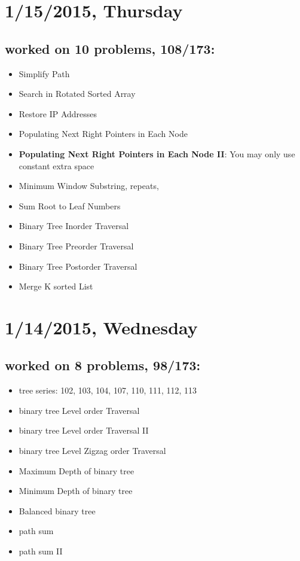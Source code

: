 \documentclass[9pt,b5paper]{article}
\begin{document}
\section{1/15/2015, Thursday}
\label{sec-12}
\subsection{worked on 10 problems, 108/173:}
\label{sec-12-1}
\begin{itemize}
\item Simplify Path
\item Search in Rotated Sorted Array
\item Restore IP Addresses
\item Populating Next Right Pointers in Each Node
\item \textbf{Populating Next Right Pointers in Each Node II}: You may only use constant extra space
\item Minimum Window Substring, repeats,
\item Sum Root to Leaf Numbers
\item Binary Tree Inorder Traversal
\item Binary Tree Preorder Traversal
\item Binary Tree Postorder Traversal
\item Merge K sorted List
\end{itemize}
\section{1/14/2015, Wednesday}
\label{sec-13}
\subsection{worked on 8 problems, 98/173:}
\label{sec-13-1}
\begin{itemize}
\item tree series: 102, 103, 104, 107, 110, 111, 112, 113
\item binary tree Level order Traversal
\item binary tree Level order Traversal II
\item binary tree Level Zigzag order Traversal
\item Maximum Depth of binary tree
\item Minimum Depth of binary tree
\item Balanced binary tree
\item path sum
\item path sum II
\end{itemize}
\end{document}
